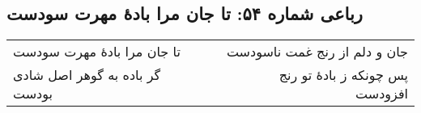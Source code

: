 \begin{center}
\section*{رباعی شماره ۵۴: تا جان مرا بادهٔ مهرت سودست}
\label{sec:sh054}
\begin{longtable}{l p{0.5cm} r}
تا جان مرا بادهٔ مهرت سودست
&&
جان و دلم از رنج غمت ناسودست
\\
گر باده به گوهر اصل شادی بودست
&&
پس چونکه ز بادهٔ تو رنج افزودست
\\
\end{longtable}
\end{center}
